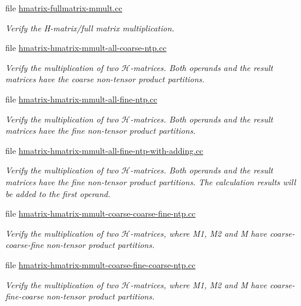\begin{DoxyCompactItemize}
file \hyperlink{hmatrix-fullmatrix-mmult_8cc}{hmatrix-\/fullmatrix-\/mmult.\+cc}
\begin{DoxyCompactList}\small\item\em Verify the H-\/matrix/full matrix multiplication. \end{DoxyCompactList}\item 
file \hyperlink{hmatrix-hmatrix-mmult-all-coarse-ntp_8cc}{hmatrix-\/hmatrix-\/mmult-\/all-\/coarse-\/ntp.\+cc}
\begin{DoxyCompactList}\small\item\em Verify the multiplication of two $\mathcal{H}$-\/matrices. Both operands and the result matrices have the coarse non-\/tensor product partitions. \end{DoxyCompactList}\item 
file \hyperlink{hmatrix-hmatrix-mmult-all-fine-ntp_8cc}{hmatrix-\/hmatrix-\/mmult-\/all-\/fine-\/ntp.\+cc}
\begin{DoxyCompactList}\small\item\em Verify the multiplication of two $\mathcal{H}$-\/matrices. Both operands and the result matrices have the fine non-\/tensor product partitions. \end{DoxyCompactList}\item 
file \hyperlink{hmatrix-hmatrix-mmult-all-fine-ntp-with-adding_8cc}{hmatrix-\/hmatrix-\/mmult-\/all-\/fine-\/ntp-\/with-\/adding.\+cc}
\begin{DoxyCompactList}\small\item\em Verify the multiplication of two $\mathcal{H}$-\/matrices. Both operands and the result matrices have the fine non-\/tensor product partitions. The calculation results will be added to the first operand. \end{DoxyCompactList}\item 
file \hyperlink{hmatrix-hmatrix-mmult-coarse-coarse-fine-ntp_8cc}{hmatrix-\/hmatrix-\/mmult-\/coarse-\/coarse-\/fine-\/ntp.\+cc}
\begin{DoxyCompactList}\small\item\em Verify the multiplication of two $\mathcal{H}$-\/matrices, where M1, M2 and M have coarse-\/coarse-\/fine non-\/tensor product partitions. \end{DoxyCompactList}\item 
file \hyperlink{hmatrix-hmatrix-mmult-coarse-fine-coarse-ntp_8cc}{hmatrix-\/hmatrix-\/mmult-\/coarse-\/fine-\/coarse-\/ntp.\+cc}
\begin{DoxyCompactList}\small\item\em Verify the multiplication of two $\mathcal{H}$-\/matrices, where M1, M2 and M have coarse-\/fine-\/coarse non-\/tensor product partitions. \end{DoxyCompactList}\item 

\end{DoxyCompactItemize}
